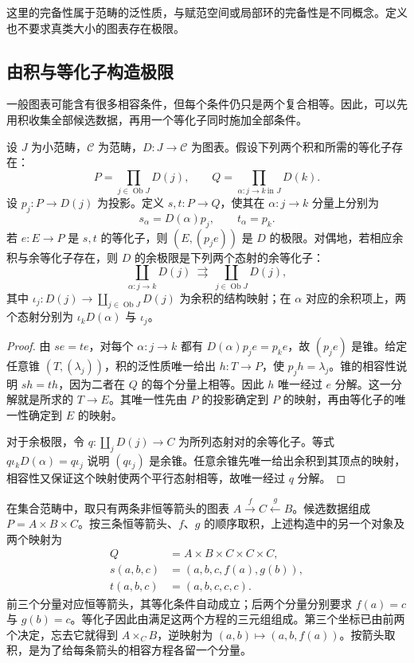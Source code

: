 这里的完备性属于范畴的泛性质，与赋范空间或局部环的完备性是不同概念。定义也不要求真类大小的图表存在极限。

\subsection{由积与等化子构造极限}
\label{b4:subsec:0202:03}

一般图表可能含有很多相容条件，但每个条件仍只是两个复合相等。因此，可以先用积收集全部候选数据，再用一个等化子同时施加全部条件。

\begin{theorem}[由积与等化子构造极限]\label{b4:thm:limits-products-equalizers}
	设 \(J\) 为小范畴，\(\mathcal C\) 为范畴，\(D:J\rightarrow\mathcal C\) 为图表。假设下列两个积和所需的等化子存在：
	\[
		P=\prod_{j\in\operatorname{Ob}J}D(j),\qquad Q=\prod_{\alpha:j\rightarrow k\ \text{in }J}D(k).
	\]
	设 \(p_j:P\rightarrow D(j)\) 为投影。定义 \(s,t:P\rightarrow Q\)，使其在 \(\alpha:j\rightarrow k\) 分量上分别为
	\[
		s_\alpha=D(\alpha)p_j,\qquad t_\alpha=p_k.
	\]
	若 \(e:E\rightarrow P\) 是 \(s,t\) 的等化子，则 \((E,(p_je))\) 是 \(D\) 的极限。对偶地，若相应余积与余等化子存在，则 \(D\) 的余极限是下列两个态射的余等化子：
	\[
		\coprod_{\alpha:j\rightarrow k}D(j) \ \rightrightarrows\
		\coprod_{j\in\operatorname{Ob}J}D(j),
	\]
	其中 \(\iota_j:D(j)\rightarrow\coprod_{j\in\operatorname{Ob}J}D(j)\) 为余积的结构映射；在 \(\alpha\) 对应的余积项上，两个态射分别为 \(\iota_kD(\alpha)\) 与 \(\iota_j\)。
\end{theorem}
\begin{proof}
	由 \(se=te\)，对每个 \(\alpha:j\rightarrow k\) 都有 \(D(\alpha)p_je=p_ke\)，故 \((p_je)\) 是锥。给定任意锥 \((T,(\lambda_j))\)，积的泛性质唯一给出 \(h:T\rightarrow P\)，使 \(p_jh=\lambda_j\)。锥的相容性说明 \(sh=th\)，因为二者在 \(Q\) 的每个分量上相等。因此 \(h\) 唯一经过 \(e\) 分解。这一分解就是所求的 \(T\rightarrow E\)。其唯一性先由 \(P\) 的投影确定到 \(P\) 的映射，再由等化子的唯一性确定到 \(E\) 的映射。

	对于余极限，令 \(q:\coprod_jD(j)\rightarrow C\) 为所列态射对的余等化子。等式 \(q\iota_kD(\alpha)=q\iota_j\) 说明 \((q\iota_j)\) 是余锥。任意余锥先唯一给出余积到其顶点的映射，相容性又保证这个映射使两个平行态射相等，故唯一经过 \(q\) 分解。
\end{proof}

在集合范畴中，取只有两条非恒等箭头的图表 \(A\xrightarrow{f}C\xleftarrow{g}B\)。候选数据组成 \(P=A\times B\times C\)。按三条恒等箭头、\(f\)、\(g\) 的顺序取积，上述构造中的另一个对象及两个映射为
\[
	\begin{aligned}
		Q&=A\times B\times C\times C\times C,\\
		s(a,b,c)&=(a,b,c,f(a),g(b)),\\
		t(a,b,c)&=(a,b,c,c,c).
	\end{aligned}
\]
前三个分量对应恒等箭头，其等化条件自动成立；后两个分量分别要求 \(f(a)=c\) 与 \(g(b)=c\)。等化子因此由满足这两个方程的三元组组成。第三个坐标已由前两个决定，忘去它就得到 \(A\times_C B\)，逆映射为 \((a,b)\mapsto(a,b,f(a))\)。按箭头取积，是为了给每条箭头的相容方程各留一个分量。

